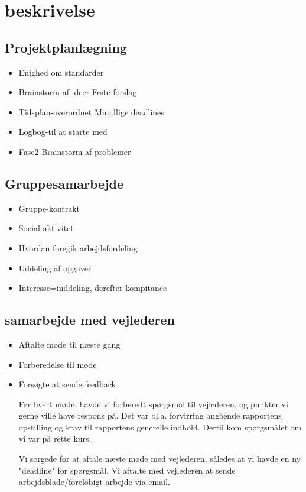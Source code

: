 



\section{beskrivelse}

\subsection{Projektplanlægning}
\begin{itemize}
\item Enighed om standarder
\item Brainstorm af ideer
\subitem Frste forslag
\item Tidsplan-overordnet
\subitem Mundlige deadlines
\item Logbog-til at starte med
\item Fase2 Brainstorm af problemer
\end{itemize}

\subsection{Gruppesamarbejde}

\begin{itemize}
\item Gruppe-kontrakt
\item Social aktivitet
\item Hvordan  foregik arbejdsfordeling
\item Uddeling af opgaver
\item Interesse=inddeling, derefter kompitance
\end{itemize}

\subsection{samarbejde med vejlederen}

\begin{itemize}
\item Aftalte møde til næste gang
\item Forberedelse til møde
\item Forsøgte at sende feedback

Før hvert møde, havde vi forberedt spørgsmål til vejlederen, og punkter vi gerne ville have respons på. Det var bl.a. forvirring angående rapportens opstilling og krav til rapportens generelle indhold. Dertil kom spørgsmålet om vi var på rette kurs.

Vi sørgede for at aftale næste møde med vejlederen, således at vi havde en ny "deadline" for spørgsmål. Vi aftalte med vejlederen at sende arbejdsblade/foreløbigt arbejde via email.

\end{itemize}

